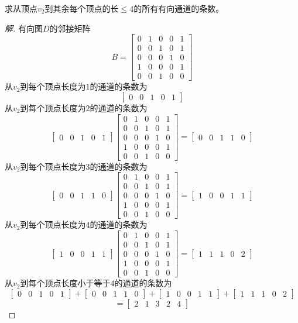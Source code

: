 \documentclass{article}
\begin{document}
\begin{CJK}{UTF8}{gbsn}
\begin{Exercise}
求从顶点$v_2$到其余每个顶点的长$\leq 4$的所有有向通道的条数。 
\end{Exercise}
\begin{proof}[解]
  有向图$D$的邻接矩阵
  \[B=\begin{bmatrix}0&1&0&0&1\\0&0&1&0&1\\0&0&0&1&0\\1&0&0&0&1\\0&0&1&0&0\end{bmatrix}\]
  从$v_2$到每个顶点长度为$1$的通道的条数为
  \[\begin{bmatrix}0&0&1&0&1\end{bmatrix}\]
  从$v_2$到每个顶点长度为$2$的通道的条数为
  \[\begin{bmatrix}0&0&1&0&1\end{bmatrix}\begin{bmatrix}0&1&0&0&1\\0&0&1&0&1\\0&0&0&1&0\\1&0&0&0&1\\0&0&1&0&0\end{bmatrix}=\begin{bmatrix}0&0&1&1&0\end{bmatrix}\]
  从$v_2$到每个顶点长度为$3$的通道的条数为
  \[\begin{bmatrix}0&0&1&1&0\end{bmatrix}\begin{bmatrix}0&1&0&0&1\\0&0&1&0&1\\0&0&0&1&0\\1&0&0&0&1\\0&0&1&0&0\end{bmatrix}=\begin{bmatrix}1&0&0&1&1\end{bmatrix}\]
  从$v_2$到每个顶点长度为$4$的通道的条数为
  \[\begin{bmatrix}1&0&0&1&1\end{bmatrix}\begin{bmatrix}0&1&0&0&1\\0&0&1&0&1\\0&0&0&1&0\\1&0&0&0&1\\0&0&1&0&0\end{bmatrix}=\begin{bmatrix}1&1&1&0&2\end{bmatrix}\]
 从$v_2$到每个顶点长度小于等于$4$的通道的条数为
\[\begin{bmatrix}0&0&1&0&1\end{bmatrix} + \begin{bmatrix}0&0&1&1&0\end{bmatrix} + \begin{bmatrix}1&0&0&1&1\end{bmatrix} + \begin{bmatrix}1&1&1&0&2\end{bmatrix}\]
   \[= \begin{bmatrix}2&1&3&2&4\end{bmatrix}\]


\end{proof}
\end{CJK}
\end{document}
